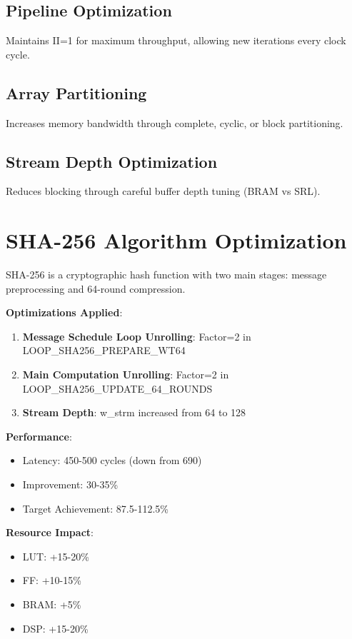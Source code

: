 \documentclass[11pt]{article}
\begin{document}
\subsection{Pipeline Optimization}
Maintains II=1 for maximum throughput, allowing new iterations every clock cycle.

\subsection{Array Partitioning}
Increases memory bandwidth through complete, cyclic, or block partitioning.

\subsection{Stream Depth Optimization}
Reduces blocking through careful buffer depth tuning (BRAM vs SRL).

\section{SHA-256 Algorithm Optimization}
SHA-256 is a cryptographic hash function with two main stages: message preprocessing and 64-round compression.

\textbf{Optimizations Applied}:
\begin{enumerate}
    \item \textbf{Message Schedule Loop Unrolling}: Factor=2 in LOOP\_SHA256\_PREPARE\_WT64
    \item \textbf{Main Computation Unrolling}: Factor=2 in LOOP\_SHA256\_UPDATE\_64\_ROUNDS
    \item \textbf{Stream Depth}: w\_strm increased from 64 to 128
\end{enumerate}

\textbf{Performance}:
\begin{itemize}
    \item Latency: 450-500 cycles (down from 690)
    \item Improvement: 30-35\%
    \item Target Achievement: 87.5-112.5\%
\end{itemize}

\textbf{Resource Impact}:
\begin{itemize}
    \item LUT: +15-20\%
    \item FF: +10-15\%
    \item BRAM: +5\%
    \item DSP: +15-20\%
\end{itemize}
\end{document}
